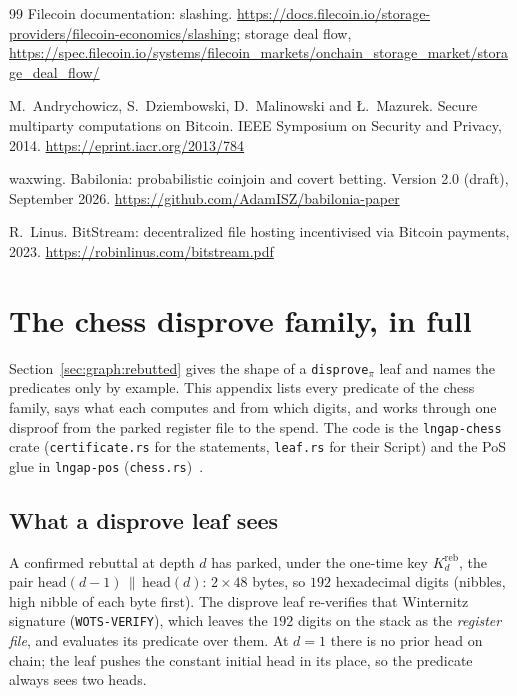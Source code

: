 \documentclass[11pt]{article}
\begin{document}
\begin{thebibliography}{99}
 Filecoin documentation: slashing. \url{https://docs.filecoin.io/storage-providers/filecoin-economics/slashing}; storage deal flow, \url{https://spec.filecoin.io/systems/filecoin_markets/onchain_storage_market/storage_deal_flow/}

 M.~Andrychowicz, S.~Dziembowski, D.~Malinowski and {\L}.~Mazurek. Secure multiparty computations on Bitcoin. IEEE Symposium on Security and Privacy, 2014. \url{https://eprint.iacr.org/2013/784}

 waxwing. Babilonia: probabilistic coinjoin and covert betting. Version 2.0 (draft), September 2026. \url{https://github.com/AdamISZ/babilonia-paper}

 R.~Linus. BitStream: decentralized file hosting incentivised via Bitcoin payments, 2023. \url{https://robinlinus.com/bitstream.pdf}

\end{thebibliography}

\appendix

\section{The chess disprove family, in full}
\label{app:chess}

Section~\ref{sec:graph:rebutted} gives the shape of a
\texttt{disprove}$_\pi$ leaf and names the predicates only by example.
This appendix lists every predicate of the chess family, says what each
computes and from which digits, and works through one disproof from the
parked register file to the spend. The code is the
\texttt{lngap-chess} crate (\texttt{certificate.rs} for the
statements, \texttt{leaf.rs} for their Script) and the PoS glue in
\texttt{lngap-pos} (\texttt{chess.rs})~\cite{lngapcode}.

\subsection{What a disprove leaf sees}

A confirmed rebuttal at depth $d$ has parked, under the one-time key
$K^{\mathrm{reb}}_d$, the pair $\mathrm{head}(d-1)\,\|\,\mathrm{head}(d)$:
$2 \times 48$ bytes, so $192$ hexadecimal digits (nibbles, high nibble
of each byte first). The disprove leaf re-verifies that Winternitz
signature (\texttt{WOTS-VERIFY}), which leaves the $192$ digits on the
stack as the \emph{register file}, and evaluates its predicate over
them. At $d = 1$ there is no prior head on chain; the leaf pushes the
constant initial head in its place, so the predicate always sees two
heads.
\end{document}
